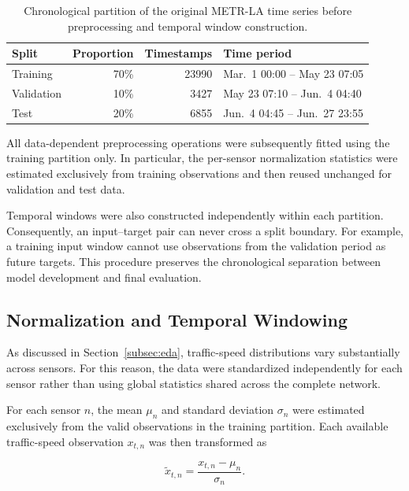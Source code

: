 \begin{table}[t]
    \centering
    \caption{Chronological partition of the original METR-LA time series
    before preprocessing and temporal window construction.}
    \label{tab:chronological_split}
    \begin{tabular}{lrrl}
        \toprule
        Split & Proportion & Timestamps & Time period \\
        \midrule
        Training   & 70\% & 23990 &
        Mar.\ 1 00:00 -- May 23 07:05 \\
        Validation & 10\% & 3427 &
        May 23 07:10 -- Jun.\ 4 04:40 \\
        Test       & 20\% & 6855 &
        Jun.\ 4 04:45 -- Jun.\ 27 23:55 \\
        \bottomrule
    \end{tabular}
\end{table}

All data-dependent preprocessing operations were subsequently fitted using
the training partition only. In particular, the per-sensor normalization
statistics were estimated exclusively from training observations and then
reused unchanged for validation and test data.

Temporal windows were also constructed independently within each partition.
Consequently, an input--target pair can never cross a split boundary. For
example, a training input window cannot use observations from the validation
period as future targets. This procedure preserves the chronological
separation between model development and final evaluation.

\subsection{Normalization and Temporal Windowing}
\label{subsec:windowing}

As discussed in Section~\ref{subsec:eda}, traffic-speed distributions vary
substantially across sensors. For this reason, the data were standardized
independently for each sensor rather than using global statistics shared
across the complete network.

For each sensor $n$, the mean $\mu_n$ and standard deviation $\sigma_n$ were
estimated exclusively from the valid observations in the training partition.
Each available traffic-speed observation $x_{t,n}$ was then transformed as

\begin{equation}
    \tilde{x}_{t,n}
    =
    \frac{x_{t,n}-\mu_n}{\sigma_n}.
    \label{eq:normalization}
\end{equation}

